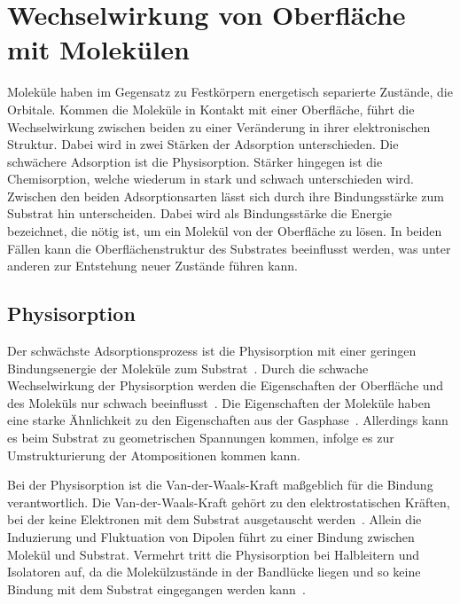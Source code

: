     \section{Wechselwirkung von Oberfläche mit Molekülen} \label{sec:WW}
        Moleküle haben im Gegensatz zu Festkörpern energetisch separierte Zustände, die Orbitale.
        Kommen die Moleküle in Kontakt mit einer Oberfläche, führt die Wechselwirkung zwischen beiden zu einer Veränderung in ihrer elektronischen Struktur.
        Dabei wird in zwei Stärken der Adsorption unterschieden.
        Die schwächere Adsorption ist die Physisorption.
        Stärker hingegen ist die Chemisorption, welche wiederum in stark und schwach unterschieden wird.
        Zwischen den beiden Adsorptionsarten lässt sich durch ihre Bindungsstärke zum Substrat hin unterscheiden.
        Dabei wird als Bindungsstärke die Energie bezeichnet, die nötig ist, um ein Molekül von der Oberfläche zu lösen.
        In beiden Fällen kann die Oberflächenstruktur des Substrates beeinflusst werden, was unter anderen zur Entstehung neuer Zustände führen kann.
        
        \subsection{Physisorption}
            Der schwächste Adsorptionsprozess ist die Physisorption mit einer geringen Bindungsenergie der Moleküle zum Substrat~\cite{IF_16}. 
            Durch die schwache Wechselwirkung der Physisorption werden die Eigenschaften der Oberfläche und des Moleküls nur schwach beeinflusst~\cite{bergenti_spinterface_2019}.
            Die Eigenschaften der Moleküle haben eine starke Ähnlichkeit zu den Eigenschaften aus der Gasphase~\cite{IF_16}.
            Allerdings kann es beim Substrat zu geometrischen Spannungen kommen, infolge es zur Umstrukturierung der Atompositionen kommen kann.

            Bei der Physisorption ist die Van-der-Waals-Kraft maßgeblich für die Bindung verantwortlich.
            Die Van-der-Waals-Kraft gehört zu den elektrostatischen Kräften, bei der keine Elektronen mit dem Substrat ausgetauscht werden~\cite{bergenti_spinterface_2019}.
            Allein die Induzierung und Fluktuation von Dipolen führt zu einer Bindung zwischen Molekül und Substrat.
            Vermehrt tritt die Physisorption bei Halbleitern und Isolatoren auf, da die Molekülzustände in der Bandlücke liegen und so keine Bindung mit dem Substrat eingegangen werden kann~\cite{IF_1}.

